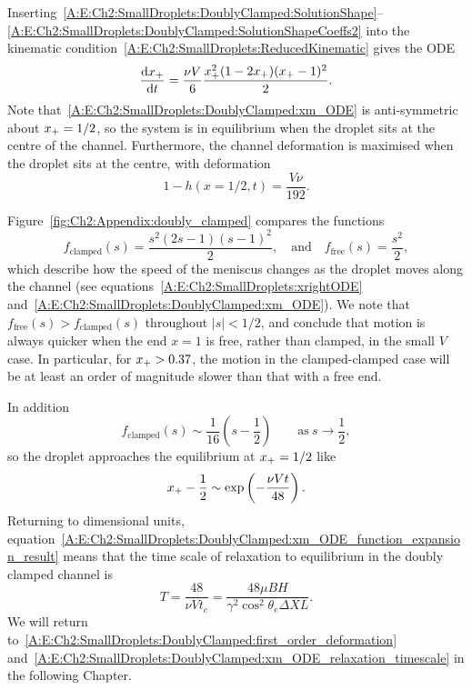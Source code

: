\begin{subappendices}
Inserting~\eqref{A:E:Ch2:SmallDroplets:DoublyClamped:SolutionShape}--\eqref{A:E:Ch2:SmallDroplets:DoublyClamped:SolutionShapeCoeffs2} into the kinematic condition~\eqref{A:E:Ch2:SmallDroplets:ReducedKinematic} gives the ODE
\begin{equation}\label{A:E:Ch2:SmallDroplets:DoublyClamped:xm_ODE}
\frac{\mathrm{d} x_{+}}{\mathrm{d} t} = \frac{\nu V}{6}\frac{x_{+}^2(1-2x_{+}) (x_{+} -1)^2}{2}.
\end{equation}
Note that~\eqref{A:E:Ch2:SmallDroplets:DoublyClamped:xm_ODE} is anti-symmetric about $x_{+} = 1/2$, so the system is in equilibrium when the droplet sits at the centre of the channel. Furthermore, the channel deformation is maximised when the droplet sits at the centre, with deformation
\begin{equation}\label{A:E:Ch2:SmallDroplets:DoublyClamped:first_order_deformation}
1 - h(x = 1/2,t) = \frac{V \nu}{192}.
\end{equation}

Figure~\ref{fig:Ch2:Appendix:doubly_clamped} compares the functions
\begin{equation}\label{A:E:Ch2:SmallDroplets:DoublyClamped:xm_ODE_functions}
f_{\text{clamped}}(s) = \frac{s^2(2s-1)(s-1)^2}{2}, \quad \text{and}\quad f_{\text{free}}(s) = \frac{s^2}{2},
\end{equation}
which describe how the speed of the meniscus changes as the droplet moves along the channel (see equations~\eqref{A:E:Ch2:SmallDroplets:xrightODE} and~\eqref{A:E:Ch2:SmallDroplets:DoublyClamped:xm_ODE}). We note that $f_{\text{free}}(s) > f_{\text{clamped}}(s)$ throughout $|s| < 1/2$, and conclude that motion is always quicker when the end $x = 1$ is free, rather than clamped, in the small $V$ case. In particular, for $x_{+} > 0.37$, the motion in the clamped-clamped case will be at least an order of magnitude slower than that with a free end.

In addition
\begin{equation}\label{A:E:Ch2:SmallDroplets:DoublyClamped:xm_ODE_function_expansion}
f_{\text{clamped}}(s) \sim \frac{1}{16}\left(s - \frac{1}{2}\right) \qquad \text{as}~s \to \frac{1}{2},
\end{equation}
so the droplet approaches the equilibrium at $x_{+} = 1/2$ like
\begin{equation}\label{A:E:Ch2:SmallDroplets:DoublyClamped:xm_ODE_function_expansion_result}
x_{+} -\frac{1}{2}\sim \exp \left(-\frac{\nu V t}{48}\right).
\end{equation}
Returning to dimensional units, equation~\eqref{A:E:Ch2:SmallDroplets:DoublyClamped:xm_ODE_function_expansion_result} means that the time scale of relaxation to equilibrium in the doubly clamped channel is
\begin{equation}\label{A:E:Ch2:SmallDroplets:DoublyClamped:xm_ODE_relaxation_timescale}
T =\frac{48}{\nu V t_c}= \frac{48\mu B H}{\gamma^2 \cos^2 \theta_e \Delta X L}.
\end{equation}
We will return to~\eqref{A:E:Ch2:SmallDroplets:DoublyClamped:first_order_deformation} and~\eqref{A:E:Ch2:SmallDroplets:DoublyClamped:xm_ODE_relaxation_timescale} in the following Chapter.

\end{subappendices}
